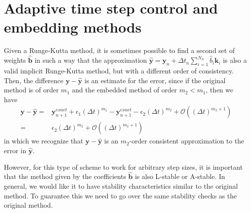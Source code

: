 \documentclass[10pt,a4paper]{article}
\newcommand{\bvec}[1]{\mathbf{#1}}
\begin{document}
\section{Adaptive time step control and embedding methods}

Given a Runge-Kutta method, it is sometimes possible to find a second set of weights $\hat{\bvec{b}}$ in such a way that the approximation $\hat{\bvec{y}} = \bvec{y}_n + \Delta t_n \sum_{i=1}^{N_S} \hat{b}_i\bvec{k}_i$ is also a valid implicit Runge-Kutta method, but with a different order of consistency.
Then, the difference $\bvec{y} - \hat{\bvec{y}}$ is an estimate for the error, since if the original method is of order $m_1$ and the embedded method of order $m_2 < m_1$, then we have
\begin{align*}
  \bvec{y} - \hat{\bvec{y}} =& \bvec{y}_{n+1}^{exact} + \epsilon_1 (\Delta t)^{m_1} - \bvec{y}_{n+1}^{exact} - \epsilon_2 (\Delta t)^{m_2} + \mathcal{O}((\Delta t)^{m_2+1}) \\
  =& \epsilon_{2}(\Delta t)^{m_2} + \mathcal{O}((\Delta t)^{m_2+1})
\end{align*}
in which we recognize that $\bvec{y}-\hat{\bvec{y}}$ is an $m_2$-order consistent approximation to the error in $\hat{\bvec{y}}.$

However, for this type of scheme to work for arbitrary step sizes, it is important that the method given by the coefficients $\hat{\bvec{b}}$ is also L-stable or A-stable. In general, we would like it to have stability characteristics similar to the original method.
To guarantee this we need to go over the same stability checks as the original method.
\end{document}
